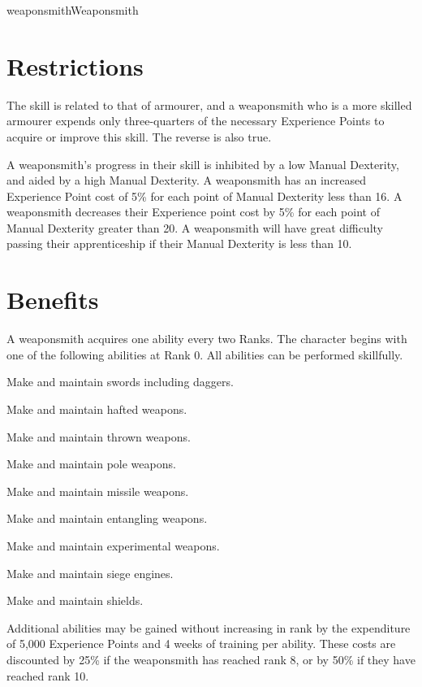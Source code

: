 \begin{Skill}[1.1]{weaponsmith}{Weaponsmith}

\section{Restrictions}

The skill is related to that of armourer, and a weaponsmith who is a
more skilled armourer expends only three-quarters of the necessary
Experience Points to acquire or improve this skill.  The reverse is
also true.

A weaponsmith’s progress in their skill is inhibited by a low Manual
Dexterity, and aided by a high Manual Dexterity.  A weaponsmith has an
increased Experience Point cost of 5\% for each point of Manual
Dexterity less than 16.  A weaponsmith decreases their Experience
point cost by 5\% for each point of Manual Dexterity greater than
20. A weaponsmith will have great difficulty passing their
apprenticeship if their Manual Dexterity is less than 10.

\section{Benefits}

A weaponsmith acquires one ability every two Ranks.  The character
begins with one of the following abilities at Rank 0.  All abilities
can be performed skillfully.

\begin{Itemize}
\item  Make and maintain swords including daggers. 
\item  Make and maintain hafted weapons. 
\item  Make and maintain thrown weapons. 
\item  Make and maintain pole weapons. 
\item  Make and maintain missile weapons. 
\item  Make and maintain entangling weapons.
\item  Make and maintain experimental weapons. 
\item  Make and maintain siege engines. 
\item  Make and maintain shields. 
\end{Itemize}

Additional abilities may be gained without increasing in rank by the
expenditure of 5,000 Experience Points and 4 weeks of training per
ability.  These costs are discounted by 25\% if the weaponsmith has
reached rank 8, or by 50\% if they have reached rank 10.


\end{Skill}
